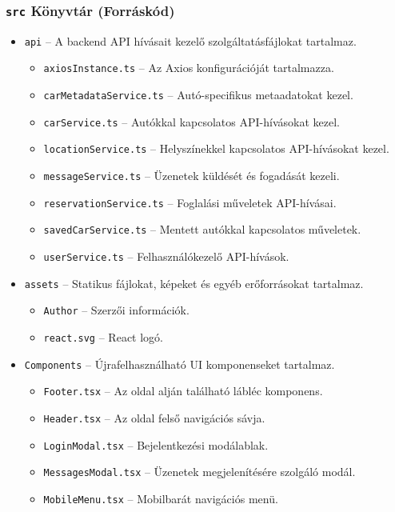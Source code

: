 \documentclass{report}[11pt]
\begin{document}
\subsubsection{\texttt{src} Könyvtár (Forráskód)}

\begin{itemize}
    \item \texttt{api} – A backend API hívásait kezelő szolgáltatásfájlokat tartalmaz.
    \begin{itemize}
        \item \texttt{axiosInstance.ts} – Az Axios konfigurációját tartalmazza.
        \item \texttt{carMetadataService.ts} – Autó-specifikus metaadatokat kezel.
        \item \texttt{carService.ts} – Autókkal kapcsolatos API-hívásokat kezel.
        \item \texttt{locationService.ts} – Helyszínekkel kapcsolatos API-hívásokat kezel.
        \item \texttt{messageService.ts} – Üzenetek küldését és fogadását kezeli.
        \item \texttt{reservationService.ts} – Foglalási műveletek API-hívásai.
        \item \texttt{savedCarService.ts} – Mentett autókkal kapcsolatos műveletek.
        \item \texttt{userService.ts} – Felhasználókezelő API-hívások.
    \end{itemize}
    \item \texttt{assets} – Statikus fájlokat, képeket és egyéb erőforrásokat tartalmaz.
    \begin{itemize}
        \item \texttt{Author} – Szerzői információk.
        \item \texttt{react.svg} – React logó.
    \end{itemize}
    \item \texttt{Components} – Újrafelhasználható UI komponenseket tartalmaz.
    \begin{itemize}
        \item \texttt{Footer.tsx} – Az oldal alján található lábléc komponens.
        \item \texttt{Header.tsx} – Az oldal felső navigációs sávja.
        \item \texttt{LoginModal.tsx} – Bejelentkezési modálablak.
        \item \texttt{MessagesModal.tsx} – Üzenetek megjelenítésére szolgáló modál.
        \item \texttt{MobileMenu.tsx} – Mobilbarát navigációs menü.

\end{itemize}
\end{itemize}
\end{document}
